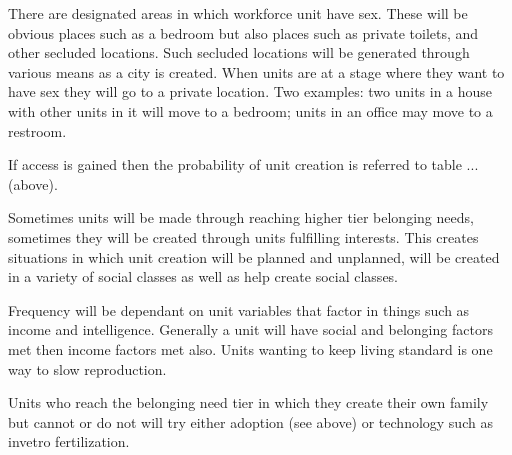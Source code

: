 There are designated areas in which workforce unit have sex. These will be obvious places such as a bedroom but also places such as private toilets, and other secluded locations. Such secluded locations will be generated through various means as a city is created. When units are at a stage where they want to have sex they will go to a private location. Two examples: two units in a house with other units in it will move to a bedroom; units in an office may move to a restroom. 

If access is gained then the probability of unit creation is referred to table ... (above).

Sometimes units will be made through reaching higher tier belonging needs, sometimes they will be created through units fulfilling interests. This creates situations in which unit creation will be planned and unplanned, will be created in a variety of social classes as well as help create social classes.

Frequency will be dependant on unit variables that factor in things such as income and intelligence.
Generally a unit will have social and belonging factors met then income factors met also. 
Units wanting to keep living standard is one way to slow reproduction.








Units who reach the belonging need tier in which they create their own family but cannot or do not will try either adoption (see above) or technology such as invetro fertilization. 

